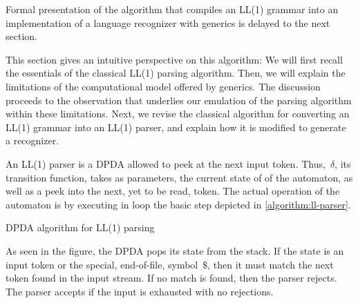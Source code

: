 Formal presentation of the algorithm that compiles an LL(1) grammar into an implementation of a
  language recognizer with \Java generics
  is delayed to the next section.

This section gives an intuitive perspective on this algorithm:
We will first recall the essentials of the classical LL(1) parsing algorithm.
Then, we will explain the limitations of the computational model
  offered by \Java generics.
The discussion proceeds to the observation
  that underlies our emulation of the parsing algorithm
  within these limitations.
Next, we revise the classical algorithm for converting
  an LL(1) grammar into an LL(1) parser, and explain
  how it is modified to generate a recognizer.

An LL(1) parser is a DPDA allowed to peek at the next input token.
Thus,~$δ$, its transition function, takes as parameters, the current state of
of the automaton, as well as a peek into the next, yet to be read,
  token.
The actual operation of the automaton
  is by executing in loop the basic step
    depicted in \cref{algorithm:ll-parser}.

\begin{algorithm}[p]
  \caption{\label{algorithm:ll-parser}
  DPDA algorithm for LL(1) parsing}
  \begin{algorithmic}
        \ELSE
          \CONTINUE
        \FI
        \ELSE
        \FI
         
           
          \ENDFOR
        \FI
      \FI
  \end{algorithmic}
\end{algorithm}

As seen in the figure, the DPDA pops its state from the
  stack.
If the state is an input token or the special, end-of-file,
  symbol~$\$$, then it must match
  the next token found in the input stream.
If no match is found, then the parser rejects.
The parser accepts if the input is exhausted with
  no rejections.

